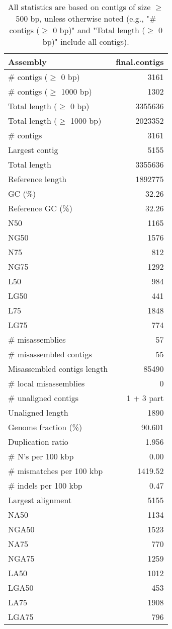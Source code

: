 \documentclass[12pt,a4paper]{article}
\begin{document}
\begin{table}[ht]
\begin{center}
\caption{All statistics are based on contigs of size $\geq$ 500 bp, unless otherwise noted (e.g., "\# contigs ($\geq$ 0 bp)" and "Total length ($\geq$ 0 bp)" include all contigs).}
\begin{tabular}{|l*{1}{|r}|}
\hline
Assembly & final.contigs \\ \hline
\# contigs ($\geq$ 0 bp) & 3161 \\ \hline
\# contigs ($\geq$ 1000 bp) & 1302 \\ \hline
Total length ($\geq$ 0 bp) & 3355636 \\ \hline
Total length ($\geq$ 1000 bp) & 2023352 \\ \hline
\# contigs & 3161 \\ \hline
Largest contig & 5155 \\ \hline
Total length & 3355636 \\ \hline
Reference length & 1892775 \\ \hline
GC (\%) & 32.26 \\ \hline
Reference GC (\%) & 32.26 \\ \hline
N50 & 1165 \\ \hline
NG50 & 1576 \\ \hline
N75 & 812 \\ \hline
NG75 & 1292 \\ \hline
L50 & 984 \\ \hline
LG50 & 441 \\ \hline
L75 & 1848 \\ \hline
LG75 & 774 \\ \hline
\# misassemblies & 57 \\ \hline
\# misassembled contigs & 55 \\ \hline
Misassembled contigs length & 85490 \\ \hline
\# local misassemblies & 0 \\ \hline
\# unaligned contigs & 1 + 3 part \\ \hline
Unaligned length & 1890 \\ \hline
Genome fraction (\%) & 90.601 \\ \hline
Duplication ratio & 1.956 \\ \hline
\# N's per 100 kbp & 0.00 \\ \hline
\# mismatches per 100 kbp & 1419.52 \\ \hline
\# indels per 100 kbp & 0.47 \\ \hline
Largest alignment & 5155 \\ \hline
NA50 & 1134 \\ \hline
NGA50 & 1523 \\ \hline
NA75 & 770 \\ \hline
NGA75 & 1259 \\ \hline
LA50 & 1012 \\ \hline
LGA50 & 453 \\ \hline
LA75 & 1908 \\ \hline
LGA75 & 796 \\ \hline
\end{tabular}
\end{center}
\end{table}
\end{document}
